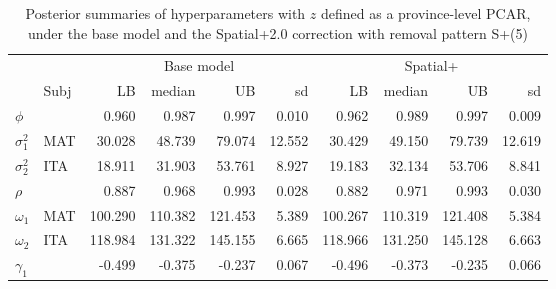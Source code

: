 \documentclass{book}
\begin{document}
\begin{appendices}
\begin{table}[ht]
\centering
\begin{tabular}{ll|rrrr|rrrr}
  \hline
  && \multicolumn{4}{c|}{Base model} & \multicolumn{4}{c}{Spatial+}\\
 & Subj & LB & median & UB & sd & LB & median & UB & sd \\ 
  \hline
  $\phi$ &         & 0.960 & 0.987 & 0.997 & 0.010 & 0.962 & 0.989 & 0.997 & 0.009 \\ 
  $\sigma_1^2$ & MAT & 30.028 & 48.739 & 79.074 & 12.552 & 30.429 & 49.150 & 79.739 & 12.619 \\ 
  $\sigma_2^2$ & ITA & 18.911 & 31.903 & 53.761 & 8.927 & 19.183 & 32.134 & 53.706 & 8.841 \\ 
  $\rho$ &      & 0.887 & 0.968 & 0.993 & 0.028 & 0.882 & 0.971 & 0.993 & 0.030 \\ 
  $\omega_1$ & MAT & 100.290 & 110.382 & 121.453 & 5.389 & 100.267 & 110.319 & 121.408 & 5.384 \\ 
  $\omega_2$ & ITA & 118.984 & 131.322 & 145.155 & 6.665 & 118.966 & 131.250 & 145.128 & 6.663 \\ 
  $\gamma_1$ &       & -0.499 & -0.375 & -0.237 & 0.067 & -0.496 & -0.373 & -0.235 & 0.066 \\ 
   \hline
\end{tabular}
\caption{Posterior summaries of hyperparameters with $z$ defined as a province-level PCAR, under the base model and the Spatial+2.0 correction with removal pattern S+(5)}
\label{tab:PCARhyper}
\end{table}

\end{appendices}


 \label{chapter:INLAINVALSI}
\end{document}
